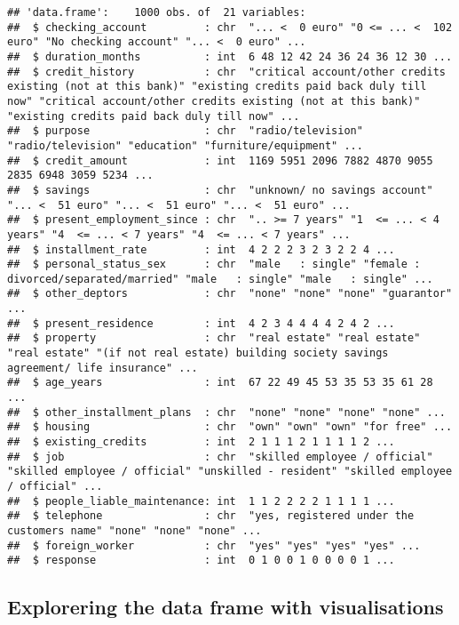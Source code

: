 \documentclass[
]{article}
\begin{document}
\begin{verbatim}
## 'data.frame':    1000 obs. of  21 variables:
##  $ checking_account         : chr  "... <  0 euro" "0 <= ... <  102 euro" "No checking account" "... <  0 euro" ...
##  $ duration_months          : int  6 48 12 42 24 36 24 36 12 30 ...
##  $ credit_history           : chr  "critical account/other credits existing (not at this bank)" "existing credits paid back duly till now" "critical account/other credits existing (not at this bank)" "existing credits paid back duly till now" ...
##  $ purpose                  : chr  "radio/television" "radio/television" "education" "furniture/equipment" ...
##  $ credit_amount            : int  1169 5951 2096 7882 4870 9055 2835 6948 3059 5234 ...
##  $ savings                  : chr  "unknown/ no savings account" "... <  51 euro" "... <  51 euro" "... <  51 euro" ...
##  $ present_employment_since : chr  ".. >= 7 years" "1  <= ... < 4 years" "4  <= ... < 7 years" "4  <= ... < 7 years" ...
##  $ installment_rate         : int  4 2 2 2 3 2 3 2 2 4 ...
##  $ personal_status_sex      : chr  "male   : single" "female : divorced/separated/married" "male   : single" "male   : single" ...
##  $ other_deptors            : chr  "none" "none" "none" "guarantor" ...
##  $ present_residence        : int  4 2 3 4 4 4 4 2 4 2 ...
##  $ property                 : chr  "real estate" "real estate" "real estate" "(if not real estate) building society savings agreement/ life insurance" ...
##  $ age_years                : int  67 22 49 45 53 35 53 35 61 28 ...
##  $ other_installment_plans  : chr  "none" "none" "none" "none" ...
##  $ housing                  : chr  "own" "own" "own" "for free" ...
##  $ existing_credits         : int  2 1 1 1 2 1 1 1 1 2 ...
##  $ job                      : chr  "skilled employee / official" "skilled employee / official" "unskilled - resident" "skilled employee / official" ...
##  $ people_liable_maintenance: int  1 1 2 2 2 2 1 1 1 1 ...
##  $ telephone                : chr  "yes, registered under the customers name" "none" "none" "none" ...
##  $ foreign_worker           : chr  "yes" "yes" "yes" "yes" ...
##  $ response                 : int  0 1 0 0 1 0 0 0 0 1 ...
\end{verbatim}

\hypertarget{explorering-the-data-frame-with-visualisations}{%
\subsection{Explorering the data frame with
visualisations}\label{explorering-the-data-frame-with-visualisations}}
\end{document}
